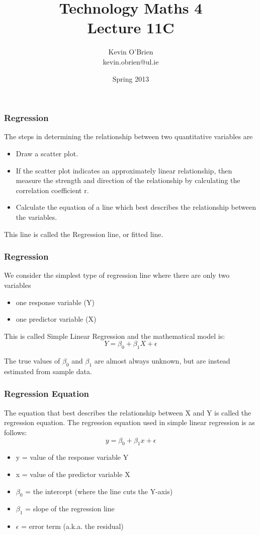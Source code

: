 \documentclass[a4]{beamer}
\title[MA4704]{Technology Maths 4 \\ {\normalsize Lecture 11C}}
\author[Kevin O'Brien]{Kevin O'Brien \\ {\scriptsize kevin.obrien@ul.ie}}
\date{Spring 2013}
\institute[Maths \& Stats]{Dept. of Mathematics \& Statistics, \\ University \textit{of} Limerick}
\begin{document}
\begin{frame}
\titlepage
\end{frame}

\begin{frame}
\frametitle{Regression}
The steps in determining the relationship between two
quantitative variables are
\begin{itemize} \item Draw a scatter plot.
\item If the scatter plot indicates an approximately linear
relationship, then measure the strength and direction of the
relationship by calculating the correlation coefficient r.
\item Calculate the equation of a line which best describes the
relationship between the variables.
\end{itemize}
This line is called the Regression line, or fitted line.

\end{frame}
\begin{frame}
\frametitle{Regression}
We consider the simplest type of regression line where there are only two
variables
\begin{itemize}
\item  one response variable (Y)
\item one predictor variable (X)
\end{itemize}
This is called Simple Linear Regression and the mathematical model is:
\[ Y = \beta_0 + \beta_1X + \epsilon \]

The true values of $\beta_0$ and  $\beta_1$ are almost always unknown, but are instead estimated from sample data.
\end{frame}
\begin{frame}
\frametitle{Regression Equation}
The equation that best describes the relationship between X and Y is called
the regression equation. The regression equation used in simple linear
regression is as follows:
\[ y = \beta_0 + \beta_1x + \epsilon \]
\begin{itemize}
\item y = value of the response variable Y
\item x = value of the predictor variable X
\item $\beta_0$ = the intercept (where the line cuts the Y-axis)
\item $\beta_1$ = slope of the regression line
\item $\epsilon$ = error term (a.k.a. the residual)
\end{itemize}

\end{frame}
\end{document}
